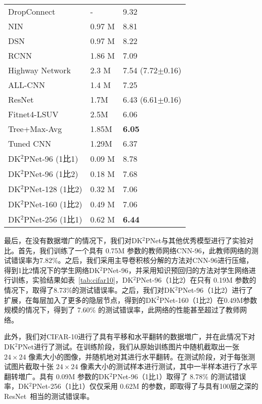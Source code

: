 \begin{table} [!h]
\begin{center}
\begin{tabular}{L{5cm}C{2cm}C{3cm}}
DropConnect~\cite{wan2013regularization} & - & 9.32 \\
NIN~\cite{lin2013network} & 0.97 M & 8.81 \\
DSN~\cite{lee2015deeply} & 0.97 M & 8.22 \\
RCNN~\cite{liang2015recurrent} & 1.86 M & 7.09 \\
Highway Network~\cite{srivastava2015training} & 2.3 M & 7.54 (7.72${\pm}$0.16) \\
ALL-CNN~\cite{springenberg2014striving} & 1.4 M & 7.25 \\
ResNet~\cite{he2015deep} & 1.7M & {6.43 (6.61${\pm}$0.16)} \\
Fitnet4-LSUV~\cite{mishkin2015all} & 2.5M & 6.06 \\
Tree+Max-Avg~\cite{lee2015generalizing} & 1.85M & \bf{6.05} \\
Tuned CNN~\cite{snoek2015scalable} & 1.29M & 6.37 \\
\hline
DK$^2$PNet-96 (1比1) & 0.09 M & {8.78} \\
DK$^2$PNet-96 (1比2) & 0.18 M &{7.68} \\
DK$^2$PNet-128 (1比2) & 0.32 M & 7.06 \\
DK$^2$PNet-160 (1比2) & 0.49 M & 7.06 \\
DK$^2$PNet-256 (1比1) & 0.62 M & \bf{6.44} \\
  \bottomrule[1.5pt]
\end{tabular}
\end{center}
\end{table}

最后，在没有数据増广的情况下，我们对DK$^2$PNet与其他优秀模型进行了实验对比。首先，我们训练了一个具有 0.75M 参数的教师网络CNN-96，此教师网络的测试错误率为7.82\%。之后，我们采用主导卷积核分解的方法对CNN-96进行压缩，得到1比2情况下的学生网络DK$^2$PNet-96，并采用知识预回归的方法对学生网络进行训练，实验结果如表~\ref{tab:cifar10}，DK$^2$PNet-96（1比2）在只有 0.19M 参数的情况下，取得了8.73\%的测试错误率。之后，我们对DK$^2$PNet-96（1比2）进行了扩展，在每层加入了更多的隐层节点，得到的DK$^2$PNet-160（1比2）在0.49M参数规模的情况下，得到了 7.60\% 的测试错误率，此网络的性能甚至超过了教师网络。


此外，我们对CIFAR-10进行了具有平移和水平翻转的数据増广，并在此情况下对DK$^2$PNet进行了测试。在训练阶段，我们从原始训练图片中随机截取出一张 $24\times24$ 像素大小的图像，并随机地对其进行水平翻转。在测试阶段，对于每张测试图片截取十张 $24\times24$ 像素大小的测试样本进行测试，其中一半样本进行了水平翻转増广。具有 0.09M 参数的DK$^2$PNet-96（1比1）取得了 8.78\% 的测试错误率，DK$^2$PNet-256（1比1）仅仅采用 0.62M 的参数，即取得了与具有100层之深的ResNet~\cite{he2015deep}相当的测试错误率。


